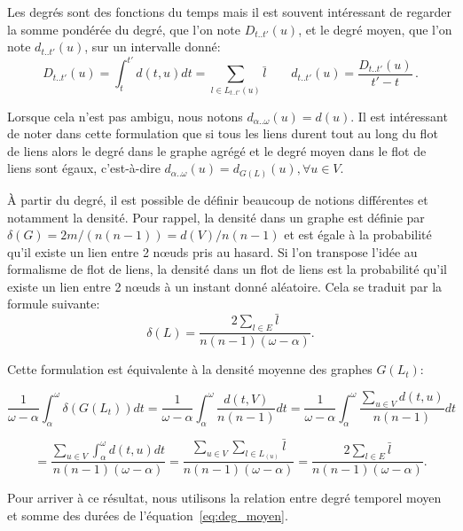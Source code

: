 Les degrés sont des fonctions du temps mais il est souvent intéressant de regarder la somme pondérée du degré, que l'on note $D_{t..t'}(u)$, et le degré moyen, que l'on note $d_{t..t'}(u)$, sur un intervalle donné:
\begin{equation}
D_{t..t'}(u)= \int_{t}^{t'}d(t,u) dt  = \sum_{l \in L_{t..t'}(u)}\bar{l} \qquad
d_{t..t'}(u)= \dfrac{D_{t..t'}(u)}{t'-t}\, .
\label{eq:deg_moyen}
\end{equation}

Lorsque cela n'est pas ambigu, nous notons $d_{\alpha..\omega}(u) = d(u)$.
Il est intéressant de noter dans cette formulation que si tous les liens durent tout au long du flot de liens alors le degré dans le graphe agrégé et le degré moyen dans le flot de liens sont égaux, c'est-à-dire  $d_{\alpha..\omega}(u) = d_{G(L)}(u), \forall u \in V$.

\`A partir du degré, il est possible de définir beaucoup de notions différentes et notamment la densité.
Pour rappel, la densité dans un graphe est définie par $\delta(G)=2m/(n(n-1))=d(V)/n(n-1)$ et est égale à la probabilité qu'il existe un lien entre 2 n\oe{}uds pris au hasard.
Si l'on transpose l'idée au formalisme de flot de liens, la densité dans un flot de liens est la probabilité qu'il existe un lien entre 2 n\oe{}uds à un instant donné aléatoire.
Cela se traduit par la formule suivante:
\begin{equation}
\delta(L)= \dfrac{2 \sum_{l \in E}\bar{l}}{n(n-1) (\omega-\alpha)}.
\end{equation}

Cette formulation est équivalente à la densité moyenne des graphes $G(L_t)$:

\begin{equation*}
\dfrac{1}{\omega-\alpha} \int_{\alpha}^{\omega} \delta(G(L_t)) dt=
\dfrac{1}{\omega-\alpha} \int_{\alpha}^{\omega} \dfrac{d(t,V)}{n(n-1)}dt=
 \dfrac{1}{\omega-\alpha} \int_{\alpha}^{\omega} \dfrac{\sum_{u \in V} d(t,u)}{n(n-1)}dt
 \end{equation*}

 \begin{equation*}
= \dfrac{\sum_{u \in V} \int_{\alpha}^{\omega}d(t,u)dt}{n(n-1)(\omega-\alpha)} =
\dfrac{\sum_{u \in V} \sum_{l \in L_(u)} \bar{l}}{n(n-1)(\omega-\alpha)} =
\dfrac{2\sum_{l \in E}\bar{l}}{n(n-1) (\omega-\alpha)} .
\end{equation*}

Pour arriver à ce résultat, nous utilisons la relation entre degré temporel moyen et somme des durées de l'équation~\ref{eq:deg_moyen}.

